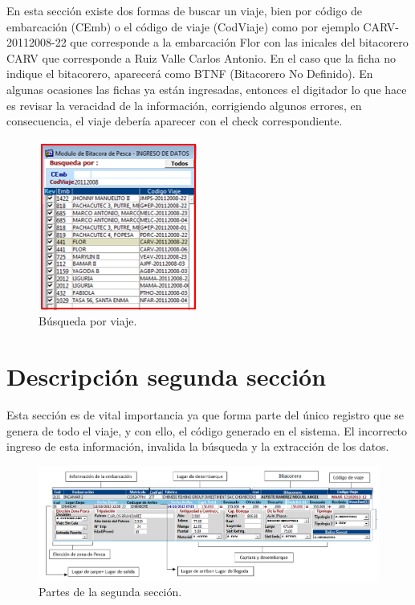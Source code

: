 \documentclass[a4paper,oneside,11pt]{book}
\begin{document}
En esta sección existe dos formas de buscar un viaje, bien por código de embarcación (CEmb) o el código de viaje (CodViaje) como por ejemplo CARV-20112008-22 que corresponde a la embarcación
Flor con las inicales del bitacorero CARV que corresponde a Ruiz Valle Carlos Antonio. En el caso que  la ficha no indique el bitacorero, aparecerá como BTNF (Bitacorero No Definido).
En algunas ocasiones las fichas ya están ingresadas, entonces el digitador lo que hace es revisar la veracidad de la información, corrigiendo algunos errores, en consecuencia, el viaje debería aparecer con el check correspondiente.
\begin{figure} [!h]
  	\begin{center}
  		\includegraphics[scale=1]{imagen_Manual_PBP/codigo}
  		\vspace{-5pt}
  		\caption{Búsqueda por viaje.}
  	\end{center}
  \end{figure}


\section{Descripción segunda sección}

Esta sección es de vital importancia ya que forma parte del único registro que se genera de todo el viaje, y con ello, el código generado en el sistema. El incorrecto ingreso de esta información, invalida la búsqueda y la extracción de los datos.
 \begin{figure} [!h]
 	\begin{center}
 		\includegraphics[scale=0.47]{imagen_Manual_PBP/partes.png}
 		\caption{Partes de la segunda sección.}
 	\end{center}
 \end{figure}
\end{document}
